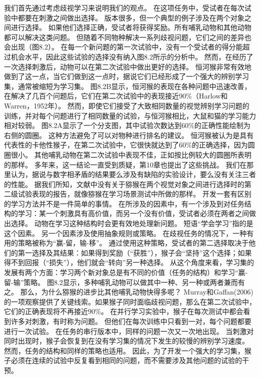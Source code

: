 我们首先通过考虑歧视学习来说明我们的观点。
在这项任务中，受试者在每次试验中都要在刺激之间做出选择。
版本很多，但一个典型的例子涉及在两个对象之间进行选择。
如果他们选择正确，受试者将获得奖励。所有哺乳动物和其他动物都可以解决这类问题。
但随着不同物种解决一系列歧视问题，它们之间的差异也会出现（图8.2）。
在每一个新问题的第一次试验中，没有一个受试者的得分能超过机会水平，因此这些试验的选择没有纳入图8.2所示的分析中。
然而，在经历了一次选择刺激后，动物可以在第二次试验中做出更好的选择。
恒河猴非常有效地做到了这一点，当它们做到这一点时，据说它们已经形成了一个强大的辨别学习集，通常被缩短为学习集。
图8.2B显示，恒河猴的表现在各种问题中迅速改善，在解决了几百个问题后，它们在第二次试验中的表现接近90$\%$（Harlow和Warren，1952年）。
然而，即使它们接受了大致相同数量的视觉辨别学习问题的训练，并对每个问题进行了相同数量的试验，与恒河猴相比，大鼠和猫的学习能力相对较弱。
图8.2A显示了一个分支图，其中试验次数达到60$\%$的正确性能绘制为右侧的圆圈。
这种方法避免了可以对物种进行排名的建议。
恒河猴被认为是具有代表性的卡他性猴子，在第二次试验中，它很快就达到了60$\%$的正确选择，因为圆圈很小。
其他哺乳动物在第二次试验中表现不佳，正如按比例较大的圆圈所表明的那样。
多年来，这一结论一直受到质疑，第10章也提出了这些挑战。
我们在那里认为，据说与数字相矛盾的结果要么涉及有缺陷的实验设计，要么没有关注三者的性能。
据我们所知，文献中没有关于猕猴在两个视觉对象之间进行选择时的第二级试验表现的报告，就像猕猴在学习场景测试中所做的那样。
开发一套有区别的学习方法并不是一件简单的事情。
在所涉及的因素中，有一个涉及到对任务结构的学习：某一个刺激具有高价值，而另一个没有价值，受试者必须在两者之间做出选择。
动物在学习这种结构时会更有效地处理新问题。
短语“学会学习”指的是这个因素。
另一个因素涉及使用抽象规则或策略。
在歧视任务的情况下，一种有用的策略被称为“赢-留，输-移”。
通过使用这种策略，受试者的第二选择取决于他们的第一选择及其结果：如果得到奖励（“获胜”），猴子会“坚持”这个选择；如果得不到回报（“损失”），他们就会“转向”另一种选择。
从这个角度来看，学习集的发展有两个方面：学习两个新对象总是有不同的价值（任务的结构）和学习“赢-留-输”策略。
图8.2显示，多种哺乳动物可以做其中一种、另一种或两者兼而有之。
那么，为什么猕猴的进步比其他哺乳动物快得多呢？
Murray和Gaffan(2006)的一项观察提供了关键线索。如果猴子同时面临歧视问题，那么在第二次试验中，它们的正确表现将不再接近90$\%$。
在并行学习实验中，猴子在每次测试中都会看到许多对刺激，有时称为问题。
但他们在每次训练中只看到一对，每个问题都要进行一次试验。
在任务的串行版本中，同样的问题一次又一次地出现。
当刺激对同时出现时，猴子会恢复到在没有学习集的情况下发生的较慢的辨别学习速度。
然而，任务的结构和同样的策略也适用。
因此，为了开发一个强大的学习集，猴子必须在连续的试验中反复看到相同的问题，而不需要涉及其他问题的试验的干预。
